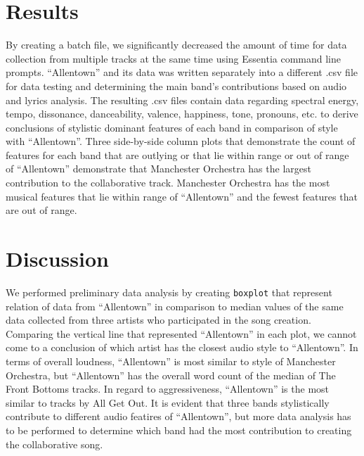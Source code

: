 \documentclass{article}\usepackage[]{graphicx}\usepackage[]{xcolor}
\begin{document}
\begin{multicols}{2}
\section{Results}
By creating a batch file, we significantly decreased the amount of time for data collection from multiple tracks at the same time using Essentia command line prompts. ``Allentown'' and its data was written separately into a different .csv file for data testing and determining the main band's contributions based on audio and lyrics analysis. The resulting .csv files contain data regarding spectral energy, tempo, dissonance, danceability, valence, happiness, tone, pronouns, etc. to derive conclusions of stylistic dominant features of each band in comparison of style with ``Allentown''. Three side-by-side column plots that demonstrate the count of features for each band that are outlying or that lie within range or out of range of ``Allentown'' demonstrate that Manchester Orchestra has the largest contribution to the collaborative track. Manchester Orchestra has the most musical features that lie within range of ``Allentown'' and the fewest features that are out of range. 

\section{Discussion}
We performed preliminary data analysis by creating \texttt{boxplot} that represent relation of data from ``Allentown'' in comparison to median values of the same data collected from three artists who participated in the song creation. 
Comparing the vertical line that represented ``Allentown'' in each plot, we cannot come to a conclusion of which artist has the closest audio style to ``Allentown''. In terms of overall loudness, ``Allentown'' is most similar to style of Manchester Orchestra, but ``Allentown'' has the overall word count of the median of The Front Bottoms tracks. In regard to aggressiveness, ``Allentown'' is the most similar to tracks by All Get Out. It is evident that three bands stylistically contribute to different audio featires of ``Allentown'', but more data analysis has to be performed to determine which band had the most contribution to creating the collaborative song.














\end{multicols}
\end{document}
